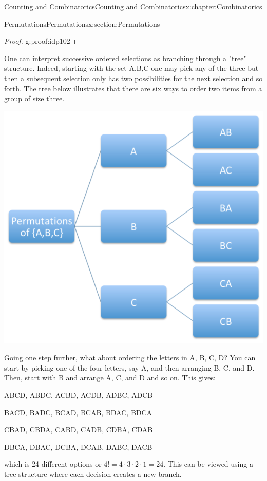 \documentclass[oneside,10pt,]{book}
\numberwithin{equation}{section}
\begin{document}
\begin{chapterptx}{Counting and Combinatorics}{}{Counting and Combinatorics}{}{}{x:chapter:Combinatorics}
\begin{sectionptx}{Permutations}{}{Permutations}{}{}{x:section:Permutations}
\begin{proof}{}{g:proof:idp102}
\end{proof}
One can interpret successive ordered selections as branching through a "tree" structure.  Indeed, starting with the set \textbraceleft{}A,B,C\textbraceright{} one may pick any of the three but then a subsequent selection only has two possibilities for the next selection and so forth. The tree below illustrates that there are six ways to order two items from a group of size three. \begin{image}{0}{1}{0}%
\includegraphics[width=\linewidth]{images/PermutationSmall.png}
\end{image}%
%
\par
Going one step further, what about ordering the letters in \textbraceleft{}A, B, C, D\textbraceright{}? You can start by picking one of the four letters, say A, and then arranging B, C, and D.  Then, start with B and arrange A, C, and D and so on.  This gives:%
\par
ABCD, ABDC, ACBD, ACDB, ADBC, ADCB%
\par
BACD, BADC, BCAD, BCAB, BDAC, BDCA%
\par
CBAD, CBDA, CABD, CADB, CDBA, CDAB%
\par
DBCA, DBAC, DCBA, DCAB, DABC, DACB%
\par
which is 24 different options or \(4! = 4 \cdot 3 \cdot 2 \cdot 1 = 24\).  This can be viewed using a tree structure where each decision creates a new branch. \begin{image}{0}{1}{0}%

\end{image}
\end{sectionptx}
\end{chapterptx}
\end{document}
